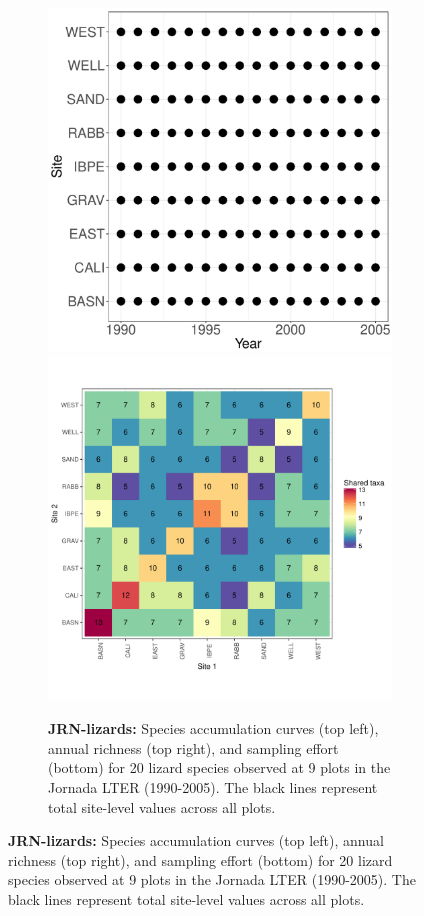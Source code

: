 \documentclass[11pt, oneside]{article}
\begin{document}
\begin{figure}[h!]
\begin{figure}[h!]
\includegraphics[scale = 0.4]{jrn-lizards-hope_spatiotemporal_sampling_effort.pdf}
\includegraphics[scale = 0.4]{jrn-lizards-hope_spp_shared.pdf}
\caption{{\bf JRN-lizards:} Species accumulation curves (top left),  annual richness (top right), and sampling effort (bottom)  for 20 lizard species observed at 9 plots in the Jornada LTER (1990-2005). The black lines represent total site-level values across all plots.}
\label{jrn-lizards}
\end{figure}




\end{figure}
\end{document}
